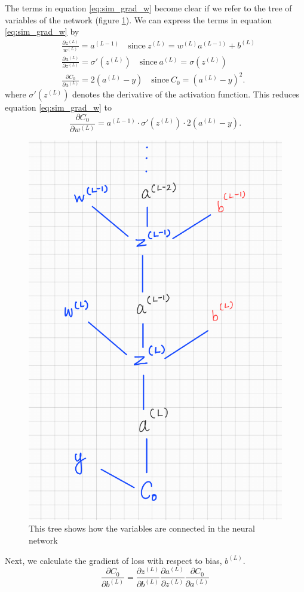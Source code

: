 The terms in equation \eqref{eq:sim_grad_w} become clear if we refer to the tree of variables of the network (figure \ref{fig:tree_NN}). We can express the terms in equation \eqref{eq:sim_grad_w} by
\begin{equation*}
    \begin{aligned}
        & \frac{\partial z^{(L)}}{w^{(L)}} = a^{(L-1)} \quad \text{since} \ z^{(L)} = w^{(L)} a^{(L-1)} + b^{(L)}\\
        & \frac{\partial a^{(L)}}{\partial z^{(L)}} = \sigma'(z^{(L)}) \quad \text{since} \ a^{(L)} = \sigma (z^{(L)})\\
        & \frac{\partial C_0}{\partial a^{(L)}} = 2 (a^{(L)} - y) \quad \text{since} \ C_0 = (a^{(L)} - y)^2.
    \end{aligned}
\end{equation*}
where $\sigma'(z^{(L)})$ denotes the derivative of the activation function. This reduces equation \eqref{eq:sim_grad_w} to 
\begin{equation}
    \label{eq:del_w}
    \frac{\partial C_0}{\partial w^{(L)}} = a^{(L-1)} \cdot \sigma'(z^{(L)}) \cdot 2(a^{(L)} -y). 
\end{equation}
\begin{figure}[htbp]
    \centering
        \includegraphics[width=.5\textwidth]{Figures/treeNN.png}
        \caption{This tree shows how the variables are connected in the neural network}
        \label{fig:tree_NN}
    \end{figure} 
Next, we calculate the gradient of loss with respect to bias, $b^{(L)}$. 
$$\frac{\partial C_0}{\partial b^{(L)}} = \frac{\partial z^{(L)}}{\partial b^{(L)}} \frac{\partial a^{(L)}}{\partial z^{(L)}} \frac{\partial C_0}{\partial a^{(L)}}$$
